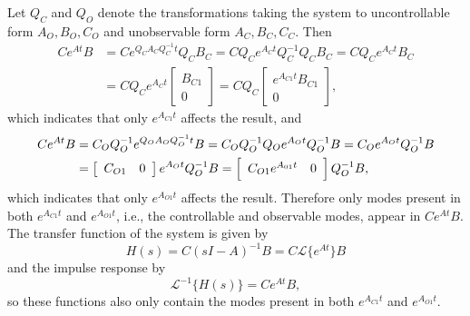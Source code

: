 \documentclass{article}
\begin{document}
Let $Q_C$ and $Q_O$ denote the transformations taking the system to
uncontrollable form $A_O, B_O, C_O$ and unobservable form $A_C, B_C,
C_C$. Then
\begin{align*}
   C e^{At} B
&= C e^{Q_C A_C Q_C^{-1} t} Q_C B_C
 = C Q_C e^{A_C t} Q_C^{-1} Q_C B_C
 = C Q_C e^{A_C t} B_C \\
&= C Q_C e^{A_C t}
   \left[\begin{array}{c}
     B_{C1} \\ 0
   \end{array}\right]
 = C Q_C
   \left[\begin{array}{c}
     e^{A_{C1} t} B_{C1} \\ 0
   \end{array}\right],
 \end{align*}
which indicates that only $e^{A_{C1} t}$ affects the result, and
\begin{align*}
   C e^{At} B
&= C_O Q_O^{-1} e^{Q_O A_O Q_O^{-1} t} B
 = C_O Q_O^{-1} Q_O e^{A_O t} Q_O^{-1} B
 = C_O e^{A_O t} Q_O^{-1} B \\
&= \left[\begin{array}{c c}
     C_{O1} & 0
   \end{array}\right]
   e^{A_O t} Q_O^{-1} B
 = \left[\begin{array}{c c}
     C_{O1} e^{A_{01} t} & 0
   \end{array}\right] Q_O^{-1} B,
\end{align*}
which indicates that only $e^{A_{O1} t}$ affects the result. Therefore
only modes present in both $e^{A_{C1} t}$ and $e^{A_{O1} t}$, i.e.,
the controllable and observable modes, appear in $C e^{At} B$.
The transfer function of the system is given by
$$
H(s) = C (sI - A)^{-1} B = C \mathcal{L}\{e^{At}\} B
$$
and the impulse response by
$$
\mathcal{L}^{-1}\{H(s)\} = C e^{At} B,
$$
so these functions also only contain the modes present in both
$e^{A_{C1} t}$ and $e^{A_{O1} t}$.

\pagebreak
\end{document}

